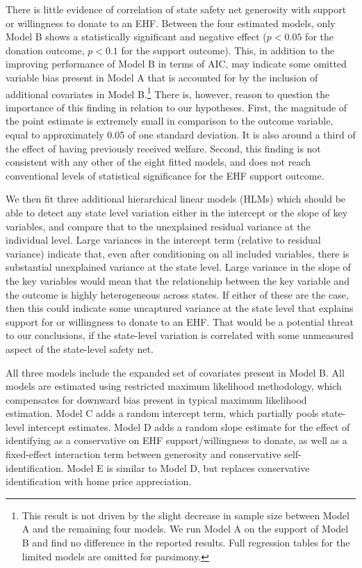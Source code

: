 \documentclass[
  11pt,
  oneside]{article}
\begin{document}
There is little evidence of correlation of state safety net generosity with support or willingness to donate to an EHF. Between the four estimated models, only Model B shows a statistically significant and negative effect (\(p<0.05\) for the donation outcome, \(p<0.1\) for the support outcome). This, in addition to the improving performance of Model B in terms of AIC, may indicate some omitted variable bias present in Model A that is accounted for by the inclusion of additional covariates in Model B.\footnote{This result is not driven by the slight decrease in sample size between Model A and the remaining four models. We run Model A on the support of Model B and find no difference in the reported results. Full regression tables for the limited models are omitted for parsimony.} There is, however, reason to question the importance of this finding in relation to our hypotheses. First, the magnitude of the point estimate is extremely small in comparison to the outcome variable, equal to approximately 0.05 of one standard deviation. It is also around a third of the effect of having previously received welfare. Second, this finding is not consistent with any other of the eight fitted models, and does not reach conventional levels of statistical significance for the EHF support outcome.

We then fit three additional hierarchical linear models (HLMs) which should be able to detect any state level variation either in the intercept or the slope of key variables, and compare that to the unexplained residual variance at the individual level. Large variances in the intercept term (relative to residual variance) indicate that, even after conditioning on all included variables, there is substantial unexplained variance at the state level. Large variance in the slope of the key variables would mean that the relationship between the key variable and the outcome is highly heterogeneous across states. If either of these are the case, then this could indicate some uncaptured variance at the state level that explains support for or willingness to donate to an EHF. That would be a potential threat to our conclusions, if the state-level variation is correlated with some unmeasured aspect of the state-level safety net.

All three models include the expanded set of covariates present in Model B. All models are estimated using restricted maximum likelihood methodology, which compensates for downward bias present in typical maximum likelihood estimation. Model C adds a random intercept term, which partially pools state-level intercept estimates. Model D adds a random slope estimate for the effect of identifying as a conservative on EHF support/willingness to donate, as well as a fixed-effect interaction term between generosity and conservative self-identification. Model E is similar to Model D, but replaces conservative identification with home price appreciation.
\end{document}
